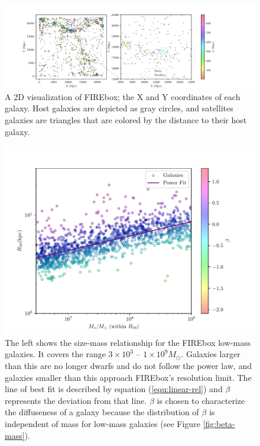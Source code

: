\begin{figure}
    \centering
    \includegraphics[width=\textwidth*11/10]{figs/me/locations.pdf}
    \caption*{
        A 2D visualization of FIREbox; the X and Y coordinates of each galaxy. Host galaxies are depicted as gray circles, and satellites galaxies are triangles that are colored by the distance to their host galaxy. 
    }
\end{figure}

\begin{figure}
    \centering
    \includegraphics[width=\textwidth*2/3]{figs/me/stars-mass-size-r50.pdf}
    \caption{
        The left shows the size-mass relationship for the FIREbox low-mass galaxies. It covers the range $3 \times 10^3$ -- $1 \times 10^9 M_\odot$. Galaxies larger than this are no longer dwarfs and do not follow the power law, and galaxies smaller than this approach FIREbox's resolution limit. The line of best fit is described by equation (\ref{equ:linear-rel}) and $\beta$ represents the deviation from that line. $\beta$ is chosen to characterize the diffuseness of a galaxy because the distribution of $\beta$ is independent of mass for low-mass galaxies (see Figure \ref{fig:beta-mass}).
    }
    \label{fig:size-mass}
\end{figure}

